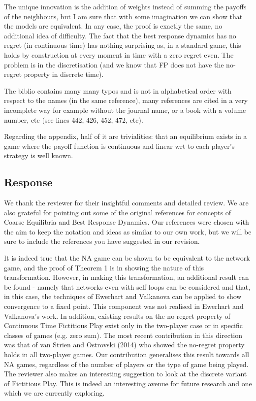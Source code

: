 \documentclass{article}
\begin{document}
	The unique innovation is the addition of weights instead of summing the payoffs of the neighbours, but I am sure that with some imagination we can show that the models are equivalent. In any case, the proof is exactly the same, no additional idea of difficulty. The fact that the best response dynamics has no regret (in continuous time) has nothing surprising as, in a standard game, this holds by construction at every moment in time with a zero regret even. The problem is in the discretisation (and we know that FP does not have the no-regret property in discrete time).
	
	The biblio contains many many typos and is not in alphabetical order with respect to the names (in the same reference), many references are cited in a very incomplete way for example without the journal name, or a book with a volume number, etc (see lines 442, 426, 452, 472, etc).
	
	Regarding the appendix, half of it are trivialities: that an equilibrium exists in a game where the payoff function is continuous and linear wrt to each player's strategy is well known.
	
	\subsection{Response}
	
	We thank the reviewer for their insightful comments and detailed review. We are also grateful for pointing out some of the original references for concepts of Coarse Equilibria and Best Response Dynamics. Our references were chosen with the aim to keep the notation and ideas as similar to our own work, but we will be sure to include the references you have suggested in our revision.
	
	It is indeed true that the NA game can be shown to be equivalent to the network game, and the proof of Theorem 1 is in showing the nature of this transformation. However, in making this transformation, an additional result can be found - namely that networks even with self loops can be considered and that, in this case, the techniques of Ewerhart and Valkanova can be applied to show convergence to a fixed point. This component was not realised in Ewerhart and Valkanova's work. In addition, existing results on the no regret property of Continuous Time Fictitious Play exist only in the two-player case or in specific classes of games (e.g. zero sum). The most recent contribution in this direction was that of van Strien and Ostrovski (2014) who showed the no-regret property holds in all two-player games. Our contribution generalises this result towards all NA games, regardless of the number of players or the type of game being played. The reviewer also makes an interesting suggestion to look at the discrete variant of Fictitious Play. This is indeed an interesting avenue for future research and one which we are currently exploring. 
	
\end{document}

